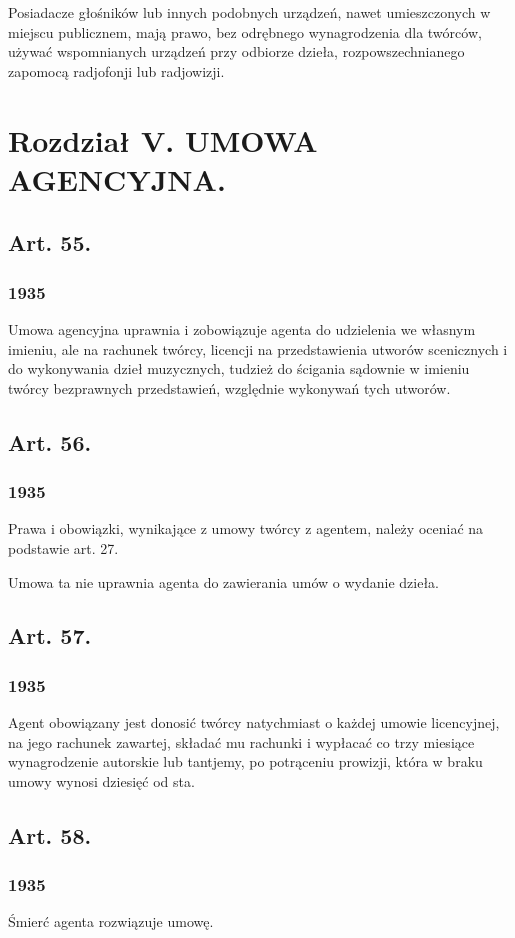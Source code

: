 \documentclass[withmarginpar]{book}
\begin{document}
Posiadacze głośników lub innych podobnych urządzeń, nawet
umieszczonych w miejscu publicznem, mają prawo, bez odrębnego
wynagrodzenia dla twórców, używać wspomnianych urządzeń przy odbiorze
dzieła, rozpowszechnianego zapomocą radjofonji lub radjowizji.

\chapter{Rozdział   V. UMOWA AGENCYJNA.}
\label{cha:r-o-z-3}

\section{Art. 55.}
\label{sec:art.-55}
\subsection{1935}
\label{sec:art.-55-1}

Umowa agencyjna uprawnia i zobowiązuje agenta do udzielenia we własnym
imieniu, ale na rachunek twórcy, licencji na przedstawienia utworów
scenicznych i do wykonywania dzieł muzycznych, tudzież do ścigania
sądownie w imieniu twórcy bezprawnych przedstawień, względnie
wykonywań tych utworów.

\section{Art. 56.}
\label{sec:art.-56}
\subsection{1935}
\label{sec:art.-56-1}

Prawa i obowiązki, wynikające z umowy twórcy z agentem, należy oceniać
na podstawie art. 27.

Umowa ta nie uprawnia agenta do zawierania umów o wydanie dzieła.


\section{Art. 57.}
\label{sec:art.-57}
\subsection{1935}
\label{sec:art.-57-1}

Agent obowiązany jest donosić twórcy natychmiast o każdej umowie
licencyjnej, na jego rachunek zawartej, składać mu rachunki i wypłacać
co trzy miesiące wynagrodzenie autorskie lub tantjemy, po potrąceniu
prowizji, która w braku umowy wynosi dziesięć od sta.

\section{Art. 58.}
\label{sec:art.-58}
\subsection{1935}
\label{sec:art.-58-1}

Śmierć agenta rozwiązuje umowę.
\end{document}
